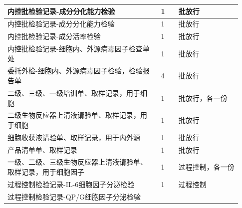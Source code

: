 \documentclass[UTF8,10pt,a4paper,fontset=fandol]{ctexart}
\newcommand{\fieldvalue}[1]{#1}
\begin{document}
\begin{center}
\begin{tabular}{|p{0.61\linewidth}|p{0.07\linewidth}|p{0.25\linewidth}|}
内控批检验记录-成分分化能力检验 &
\fieldvalue{1} &
\fieldvalue{批放行} \\ \hline
内控批检验记录-成分分化能力检验 &
\fieldvalue{1} &
\fieldvalue{批放行} \\ \hline
内控批检验记录-成分活率检验 &
\fieldvalue{1} &
\fieldvalue{批放行} \\ \hline
内控批检验记录-细胞内、外源病毒因子检查单处 &
\fieldvalue{1} &
\fieldvalue{批放行} \\ \hline
委托外检-细胞内、外源病毒因子检验，检验报告单 &
\fieldvalue{4} &
\fieldvalue{批放行} \\ \hline
二级、三级、一级培训单、取样记录，用于细胞 &
\fieldvalue{1} &
\fieldvalue{批放行，各一份} \\ \hline
二级生物反应器上清液请验单、取样记录，用于细胞 &
\fieldvalue{1} &
\fieldvalue{批放行} \\ \hline
细胞收获液请验单、取样记录，用于内外源 &
\fieldvalue{1} &
\fieldvalue{批放行} \\ \hline
产品清单单、取样记录 &
\fieldvalue{1} &
\fieldvalue{批放行} \\ \hline
一级、二级、三级生物反应器上清液请验单、取样记录，用于细胞因子 &
\fieldvalue{1} &
\fieldvalue{过程控制，各一份} \\ \hline
过程控制检验记录-IL-6细胞因子分泌检验 &
\fieldvalue{1} &
\fieldvalue{过程控制} \\ \hline
过程控制检验记录-QP/G细胞因子分泌检验 &

\end{tabular}
\end{center}
\end{document}
